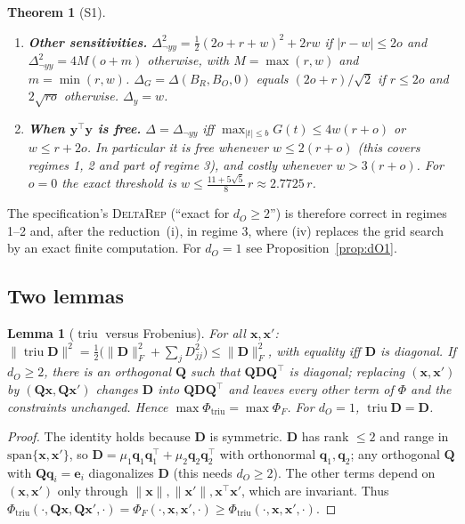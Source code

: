\documentclass[11pt]{article}
\theoremstyle{definition}
\theoremstyle{plain}
\newtheorem{theorem}[definition]{Theorem}
\newtheorem{lemma}[definition]{Lemma}
\newcommand{\by}{\mathbf{y}}
\newcommand{\bx}{\mathbf{x}}
\DeclareMathOperator{\triu}{triu}
\newcommand{\bD}{\mathbf{D}}
\newcommand{\bQ}{\mathbf{Q}}
\newcommand{\be}{\mathbf{e}}
\begin{document}
\begin{theorem}[S1]
\begin{enumerate}[label=(\roman*),nosep]
\[  \]
  for which $\bD=o\sqrt{1-c^2}\,(\be_1\be_1^\top-\be_2\be_2^\top)$. In regime 1: $y'=-y$, $\cos\angle(\bx,\bx')=-(r-w)/(2o)$; in regime 2: $y'=-y$, $\bx'=-\bx$ ($\bD=0$).
  \item \textbf{Other sensitivities.} $\Delta_{\neg yy}^2=\tfrac12(2o+r+w)^2+2rw$ if $|r-w|\le2o$ and $\Delta_{\neg yy}^2=4M(o+m)$ otherwise, with $M=\max(r,w)$ and $m=\min(r,w)$. $\Delta_G=\Delta(B_R,B_O,0)$ equals $(2o+r)/\sqrt2$ if $r\le2o$ and $2\sqrt{ro}$ otherwise. $\Delta_y=w$.
  \item \textbf{When $\by^\top\by$ is free.} $\Delta=\Delta_{\neg yy}$ iff $\max_{|t|\le b}G(t)\le4w(r+o)$ or $w\le r+2o$. In particular it is free whenever $w\le2(r+o)$ (this covers regimes 1, 2 and part of regime 3), and costly whenever $w>3(r+o)$. For $o=0$ the exact threshold is $w\le\frac{11+5\sqrt5}{8}\,r\approx2.7725\,r$.
\end{enumerate}
\end{theorem}

The specification's \textsc{DeltaRep} (``exact for $d_O\ge2$'') is therefore correct in regimes 1--2 and, after the reduction~(i), in regime 3, where (iv) replaces the grid search by an exact finite computation. For $d_O=1$ see Proposition~\ref{prop:dO1}.

\subsection{Two lemmas}

\begin{lemma}[$\triu$ versus Frobenius]\label{lem:triu}
For all $\bx,\bx'$: $\|\triu\bD\|^2=\tfrac12\bigl(\|\bD\|_F^2+\sum_jD_{jj}^2\bigr)\le\|\bD\|_F^2$, with equality iff $\bD$ is diagonal. If $d_O\ge2$, there is an orthogonal $\bQ$ such that $\bQ\bD\bQ^\top$ is diagonal; replacing $(\bx,\bx')$ by $(\bQ\bx,\bQ\bx')$ changes $\bD$ into $\bQ\bD\bQ^\top$ and leaves every other term of $\Phi$ and the constraints unchanged. Hence $\max\Phi_{\triu}=\max\Phi_F$. For $d_O=1$, $\triu\bD=\bD$.
\end{lemma}
\begin{proof}
The identity holds because $\bD$ is symmetric. $\bD$ has rank $\le2$ and range in $\mathrm{span}\{\bx,\bx'\}$, so $\bD=\mu_1\mathbf q_1\mathbf q_1^\top+\mu_2\mathbf q_2\mathbf q_2^\top$ with orthonormal $\mathbf q_1,\mathbf q_2$; any orthogonal $\bQ$ with $\bQ\mathbf q_i=\be_i$ diagonalizes $\bD$ (this needs $d_O\ge2$). The other terms depend on $(\bx,\bx')$ only through $\|\bx\|,\|\bx'\|,\bx^\top\bx'$, which are invariant. Thus $\Phi_{\triu}(\cdot,\bQ\bx,\bQ\bx',\cdot)=\Phi_F(\cdot,\bx,\bx',\cdot)\ge\Phi_{\triu}(\cdot,\bx,\bx',\cdot)$.
\end{proof}
\end{document}
